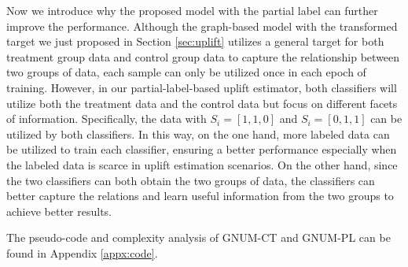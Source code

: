 Now we introduce why the proposed model with the partial label can further improve the performance. Although the graph-based model with the transformed target we just proposed in Section \ref{sec:uplift} utilizes a general target for both treatment group data and control group data to capture the relationship between two groups of data, each sample can only be utilized once in each epoch of training. However, in our partial-label-based uplift estimator, both classifiers will utilize both the treatment data and the control data but focus on different facets of information. Specifically, the data with $S_i=[1,1,0]$ and $S_i=[0,1,1]$ can be utilized by both classifiers. In this way, on the one hand, more labeled data can be utilized to train each classifier, ensuring a better performance especially when the labeled data is scarce in uplift estimation scenarios. On the other hand, since the two classifiers can both obtain the two groups of data, the classifiers can better capture the relations and learn useful information from the two groups to achieve better results. 

The pseudo-code and complexity analysis of GNUM-CT and GNUM-PL can be found in Appendix \ref{appx:code}.


